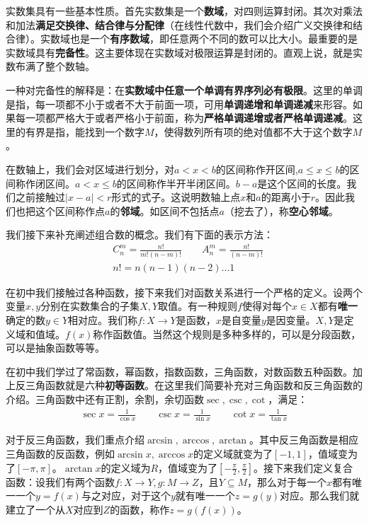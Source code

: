 \documentclass{ctexart}
\let\oldtextbf\textbf %
\renewcommand{\textbf}[1]{\textcolor{btex}{\oldtextbf{#1}}} %
\begin{document}
实数集具有一些基本性质。首先实数集是一个\textbf{\color{btex}数域}，对四则运算封闭。其次对乘法和加法\textbf{\color{btex}满足交换律、结合律与分配律}（在线性代数中，我们会介绍广义交换律和结合律）。实数域也是一个\textbf{\color{btex}有序数域}，即任意两个不同的数可以比大小。最重要的是实数域具有\textbf{\color{btex}完备性}。这主要体现在实数域对极限运算是封闭的。直观上说，就是实数布满了整个数轴。

一种对完备性的解释是：在\textbf{\color{btex}实数域中任意一个单调有界序列必有极限}。这里的单调是指，每一项都不小于或者不大于前面一项，可用\textbf{\color{btex}单调递增和单调递减}来形容。如果每一项都严格大于或者严格小于前面，称为\textbf{\color{btex}严格单调递增或者严格单调递减}。这里的有界是指，能找到一个数字$M$，使得数列所有项的绝对值都不大于这个数字$M$。

在数轴上，我们会对区域进行划分，对$a<x<b$的区间称作开区间,$a\leq x\leq b$的区间称作闭区间。$a<x \leq b$的区间称作半开半闭区间。$b-a$是这个区间的长度。我们之前接触过$|x-a|<r$形式的式子。这说明数轴上点$x$和$a$的距离小于$r$。因此我们也把这个区间称作点$a$的\textbf{\color{btex}邻域}。如区间不包括点$a$（挖去了），称\textbf{\color{btex}空心邻域}。

我们接下来补充阐述组合数的概念。我们有下面的表示方法：
\begin{align*}
    &C_n^m=\frac{n!}{m!(n-m)!} \qquad A_n^m=\frac{n!}{(n-m)!}\\
    & n!=n(n-1)(n-2)...1
\end{align*}

在初中我们接触过各种函数，接下来我们对函数关系进行一个严格的定义。设两个变量$x,y$分别在实数集合的子集$X,Y$取值。有一种规则$f$使得对每个$x\in X$都有\textbf{\color{btex}唯一}确定的数$y\in Y$相对应。我们称$f : X\to Y$是函数，$x$是自变量$y$是因变量。$X,Y$是定义域和值域。$f(x)$称作函数值。当然这个规则是多种多样的，可以是分段函数，可以是抽象函数等等。

在初中我们学过了常函数，幂函数，指数函数，三角函数，对数函数五种函数。加上反三角函数就是六种\textbf{\color{btex}初等函数}。在这里我们简要补充对三角函数和反三角函数的介绍。三角函数中还有正割，余割，余切函数$\sec,\csc,\cot$，满足：
\begin{align*}
    \sec x=\frac{1}{\cos x}\qquad \csc x=\frac{1}{\sin x}\qquad \cot x=\frac{1}{\tan x}
\end{align*}

对于反三角函数，我们重点介绍$\arcsin ,\arccos,\arctan$。其中反三角函数是相应三角函数的反函数，例如$\arcsin x,\arccos x$的定义域就变为了$[-1,1]$，值域变为了$[-\pi,\pi]$。$\arctan x$的定义域为$R$，值域变为了$[-\frac{\pi}{2},\frac{\pi}{2}]$。接下来我们定义复合函数：设我们有两个函数$f: X\to Y,g: M\to Z$，且$Y\subseteq M$，那么对于每一个$x$都有唯一一个$y=f(x)$与之对应，对于这个$y$就有唯一一个$z=g(y)$对应。那么我们就建立了一个从$X$对应到$Z$的函数，称作$z=g(f(x))$。
\end{document}
